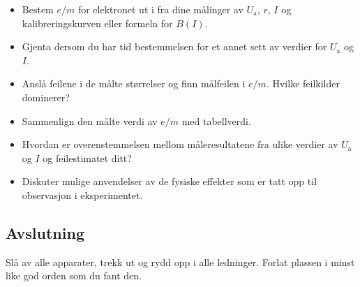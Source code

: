 \documentclass[../Elmag-labhefte-2020.tex]{subfiles}
\begin{document}
\vspace{-4mm} 
\begin{itemize}
    \item Bestem $e/m$ for elektronet ut i fra dine målinger av $U_\mathrm{a}$, $r$, $I$ og kalibreringskurven eller formeln for $B(I)$.
    \item Gjenta dersom du har tid bestemmelsen for et annet sett av verdier for $U_\mathrm{a}$ og $I$.
    \item Anslå feilene i de målte størrelser og finn målfeilen i $e/m$. 
    Hvilke feilkilder dominerer? 
    \item Sammenlign den målte verdi av $e/m$ med tabellverdi.
    \item Hvordan er overenstemmelsen mellom måleresultatene fra ulike verdier av $U_\mathrm{a}$ og $I$ og feilestimatet ditt?
    \item Diskuter mulige anvendelser av de fysiske effekter som er tatt opp til observasjon i eksperimentet.
\end{itemize}

\subsection{Avslutning}
Slå av alle apparater, trekk ut og rydd opp i alle ledninger. Forlat plassen i minst like god orden som du fant den.
\end{document}
